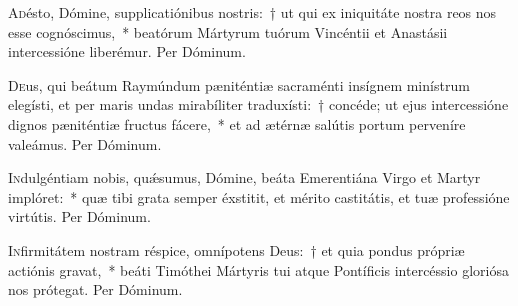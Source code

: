 \documentclass[vesperale_romanum.tex]{subfiles}
\begin{document}
\oratio

\lettrine{A}{d}ésto, Dómine, supplicatiónibus nostris:~† ut qui ex iniquitáte nostra reos nos esse cognóscimus,~* beatórum Mártyrum tuórum Vincéntii et Anastásii intercessióne liberémur.
Per Dóminum.


\myrule

\newpage


\semiduplexmtv

\oratio

\lettrine{D}{e}us, qui beátum Raymúndum pæniténtiæ sacraménti insígnem minístrum elegísti, et per maris undas mirabíliter traduxísti:~† concéde; ut ejus intercessióne dignos pæniténtiæ fru\-ctus fácere,~* et ad ætérnæ salútis portum perveníre valeámus.
Per Dóminum.



\oratio

\lettrine{I}{n}dulgéntiam nobis, quǽsumus, Dómine, beáta Emerentiána Virgo et Martyr implóret:~* quæ tibi grata semper éxstitit, et mérito castitátis, et tuæ professióne virtútis. Per Dóminum.

\vespsequentiscomm

\myrule


\duplex

\oratio

\lettrine{I}{n}firmitátem nostram réspice, omnípotens Deus:~† et quia pondus própriæ actiónis gravat,~* beáti Timóthei Mártyris tui atque Pontíficis intercéssio gloriósa nos prótegat.
Per Dóminum.

\end{document}
